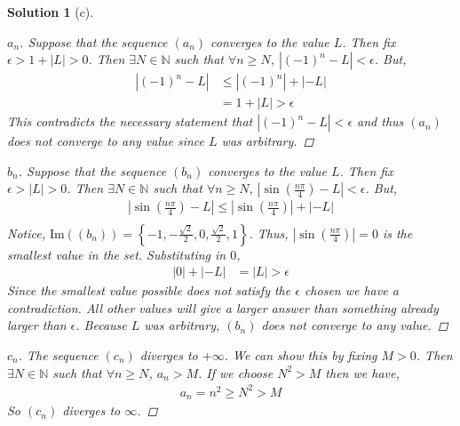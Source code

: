 \documentclass[leqno]{article}
\theoremstyle{nonumberplain}
\newtheorem{proof}{Proof}
\newtheorem{solution}{Solution}
\begin{document}
\begin{solution}[c] 
~
\vspace{5mm}

\begin{proof}[$a_n$]
Suppose that the sequence $(a_n)$ converges to the value $L$.  Then fix $\epsilon > 1 + |L| > 0$.  Then $\exists N \in \mathbb{N}$ such that $\forall n \geq N$, $|(-1)^n-L|<\epsilon$. But,
\begin{align*}
\left|(-1)^n-L\right| &\leq |(-1)^n| + |-L|\\
&= 1+|L|>\epsilon
\end{align*}
This contradicts the necessary statement that $|(-1)^n-L|<\epsilon$ and thus $(a_n)$ does not converge to any value since $L$ was arbitrary.
\end{proof}

\vspace{5mm}

\begin{proof}[$b_n$]
Suppose that the sequence $(b_n)$ converges to the value $L$.  Then fix $\epsilon > |L| > 0$.  Then $\exists N \in \mathbb{N}$ such that $\forall n \geq N$, $\left|\sin\left(\frac{n\pi}{4}\right)-L\right|<\epsilon$. But,
\begin{align*}
\left|\sin\left(\frac{n\pi}{4}\right)-L\right| \leq \left|\sin\left(\frac{n\pi}{4}\right)\right| + |-L|\\
\end{align*}
Notice, $\mathrm{Im}((b_n))=\left\{-1,-\frac{\sqrt{2}}{2},0,\frac{\sqrt{2}}{2},1\right\}$.  Thus, $\left|\sin\left(\frac{n\pi}{4}\right)\right|=0$ is the smallest value in the set.  Substituting in $0$,
\begin{align*}
|0| + |-L| &= |L| > \epsilon
\end{align*}
Since the smallest value possible does not satisfy the $\epsilon$ chosen we have a contradiction. All other values will give a larger answer than something already larger than $\epsilon$.  Because $L$ was arbitrary, $(b_n)$ does not converge to any value.
\end{proof}

\vspace{5mm}

\begin{proof}[$c_n$]
The sequence $(c_n)$ diverges to $+\infty$.  We can show this by fixing $M>0$.  Then $\exists N \in \mathbb{N}$ such that $\forall n \geq N$, $a_n>M$.  If we choose $N^2> M$ then we have,
\begin{align*}
a_n=n^2\geq N^2 > M
\end{align*}
So $(c_n)$ diverges to $\infty$.
\end{proof}


\end{solution}
\end{document}

